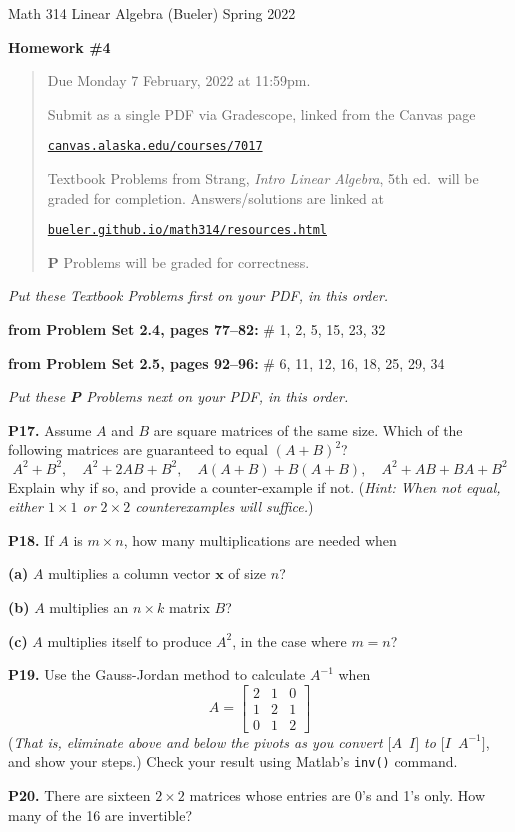\documentclass[12pt]{amsart}
\newcommand{\bx}{\bm{x}}
\newcommand{\prob}[1]{\bigskip\noindent\textbf{#1}\quad }
\newcommand{\probset}[2]{\prob{from Problem Set #1, pages #2:}}
\newcommand{\epart}[1]{\medskip\noindent\textbf{(#1)}\quad }
\begin{document}
\scriptsize \noindent Math 314 Linear Algebra (Bueler) \hfill Spring 2022
\normalsize\medskip

\Large
\centerline{\textbf{Homework \#4}}

\normalsize
\bigskip
\begin{quote}
Due Monday 7 February, 2022 at 11:59pm.

\medskip
\noindent Submit as a single PDF via Gradescope, linked from the Canvas page

\href{https://canvas.alaska.edu/courses/7017}{\texttt{canvas.alaska.edu/courses/7017}}

\noindent Textbook Problems from Strang, \emph{Intro Linear Algebra}, 5th ed.~will be graded for completion.  Answers/solutions are linked at

\href{https://bueler.github.io/math314/resources.html}{\texttt{bueler.github.io/math314/resources.html}}

\noindent \textbf{P} Problems will be graded for correctness.
\end{quote}
\medskip

\thispagestyle{empty}

\noindent \hrulefill

\noindent \emph{Put these Textbook Problems first on your PDF, in this order.}

\probset{2.4}{77--82} \# 1, 2, 5, 15, 23, 32

\probset{2.5}{92--96} \# 6, 11, 12, 16, 18, 25, 29, 34


\bigskip
\noindent \hrulefill

\noindent \emph{Put these \textbf{P} Problems next on your PDF, in this order.}

\prob{P17.}  Assume $A$ and $B$ are square matrices of the same size.  Which of the following matrices are guaranteed to equal $(A+B)^2$?
    $$A^2 + B^2, \quad A^2 + 2 A B + B^2, \quad A(A+B) + B(A+B), \quad A^2 + AB + BA + B^2$$
Explain why if so, and provide a counter-example if not.  (\emph{Hint: When not equal, either $1 \times 1$ or $2\times 2$ counterexamples will suffice.})

\prob{P18.}  If $A$ is $m \times n$, how many multiplications are needed when

\epart{a} $A$ multiplies a column vector $\bx$ of size $n$?

\epart{b} $A$ multiplies an $n\times k$ matrix $B$?

\epart{c} $A$ multiplies itself to produce $A^2$, in the case where $m=n$?

\prob{P19.}  Use the Gauss-Jordan method to calculate $A^{-1}$ when
    $$A = \begin{bmatrix} 2 & 1 & 0 \\ 1 & 2 & 1 \\ 0 & 1 & 2 \end{bmatrix}$$
(\emph{That is, eliminate above and below the pivots as you convert $\big[A\,\,\, I\big]$ to $\big[I\,\,\, A^{-1}\big]$}, and show your steps.)  Check your result using Matlab's \texttt{inv()} command.

\prob{P20.}  There are sixteen $2\times 2$ matrices whose entries are 0's and 1's only.  How many of the 16 are invertible?
\end{document}
